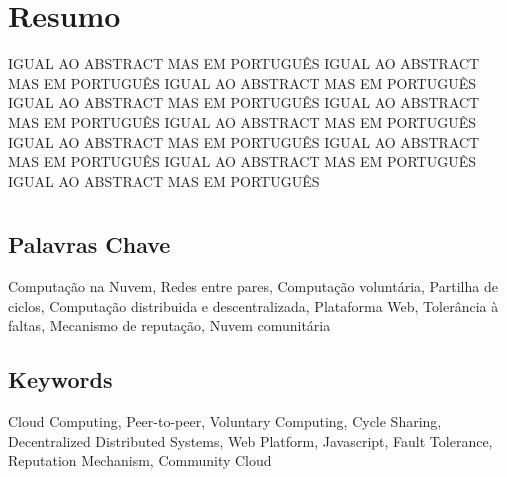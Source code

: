 \newpage
\chapter*{Resumo}
\thispagestyle{empty}

IGUAL AO ABSTRACT MAS EM PORTUGUÊS
IGUAL AO ABSTRACT MAS EM PORTUGUÊS
IGUAL AO ABSTRACT MAS EM PORTUGUÊS
IGUAL AO ABSTRACT MAS EM PORTUGUÊS
IGUAL AO ABSTRACT MAS EM PORTUGUÊS
IGUAL AO ABSTRACT MAS EM PORTUGUÊS
IGUAL AO ABSTRACT MAS EM PORTUGUÊS
IGUAL AO ABSTRACT MAS EM PORTUGUÊS
IGUAL AO ABSTRACT MAS EM PORTUGUÊS
IGUAL AO ABSTRACT MAS EM PORTUGUÊS


\newpage

\chapter*{}
\thispagestyle{empty}

\section*{Palavras Chave}
{\large %

\noindent Computa\c{c}\~ao na Nuvem,
\noindent Redes entre pares,
\noindent Computação voluntária,
\noindent Partilha de ciclos,
\noindent Computa\c{c}\~ao distribuida e descentralizada,
\noindent Plataforma Web,
\noindent Tolerância à faltas,
\noindent Mecanismo de reputação,
\noindent Nuvem comunitária
}

\section*{Keywords}

{\large %

\noindent Cloud Computing,
\noindent Peer-to-peer,
\noindent Voluntary Computing,
\noindent Cycle Sharing,
\noindent Decentralized Distributed Systems,
\noindent Web Platform,
\noindent Javascript,
\noindent Fault Tolerance,
\noindent Reputation Mechanism,
\noindent Community Cloud
}

\vfill

\cleardoublepage
\pagestyle{plain}
\def\contentsname{Index}
\tableofcontents
\newpage
\listoffigures
\newpage
\listoftables
\cleardoublepage
